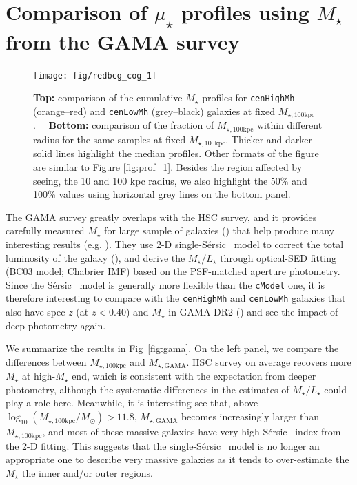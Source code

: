 \documentclass[a4paper,fleqn,usenatbib]{mnras}
\def\ser{{S\'{e}rsic\ }}
\def\rbcg{\texttt{cenHighMh}}
\def\nbcg{\texttt{cenLowMh}}
\def\mstar{{$M_{\star}$}}
\def\mtot{{$M_{\star,100\mathrm{kpc}}$}}
\def\mgama{{$M_{\star,\mathrm{GAMA}}$}}
\def\logmtot{{$\log_{10} (M_{\star,100\mathrm{kpc}}/M_{\odot})$}}
\def\m2l{{$M_{\star}/L_{\star}$}}
\def\mden{{$\mu_{\star}$}}
\begin{document}
\section{Comparison of \mden{} profiles using \mstar{} from the GAMA survey}
    \label{app:gama} 

\begin{figure}
    \centering
    \texttt{[image: fig/redbcg\_cog\_1]}
    \caption{
        \textbf{Top:} comparison of the cumulative \mstar{} profiles for 
        \rbcg{} (orange--red) and \nbcg{} (grey--black) galaxies at fixed \mtot{}.~~
        \textbf{Bottom:} comparison of the fraction of \mtot{} within different radius 
        for the same samples at fixed \mtot{}. 
        Thicker and darker solid lines highlight the median profiles. 
        Other formats of the figure are similar to Figure \ref{fig:prof_1}. 
        Besides the region affected by seeing, the 10 and 100 kpc radius, we 
        also highlight the 50\% and 100\% values using horizontal grey lines on the 
        bottom panel. 
        }
    \label{fig:cog}
\end{figure}
    
    The GAMA survey greatly overlaps with the HSC survey, and it provides carefully 
    measured \mstar{} for large sample of galaxies (\citealt{Taylor2011}) that help 
    produce many interesting results (e.g. \citealt{Bauer2013, Ferreras2017}).
    They use 2-D single-\ser{} model to correct the total luminosity of the galaxy 
    (\citealt{Kelvin2012}), and derive the \m2l{} through optical-SED fitting 
    (BC03 model; Chabrier IMF) based on the PSF-matched aperture photometry. 
    Since the \ser{} model is generally more flexible than the \texttt{cModel} one, 
    it is therefore interesting to compare with the \rbcg{} and \nbcg{} galaxies 
    that also have spec-$z$ (at $z < 0.40$) and \mstar{} in GAMA DR2 
    (\citealt{Liske2015}) and see the impact of deep photometry again. 
    
    We summarize the results in Fig~\ref{fig:gama}.  
    On the left panel, we compare the differences between \mtot{} and \mgama{}. 
    HSC survey on average recovers more \mstar{} at high-\mstar{} end, which is 
    consistent with the expectation from deeper photometry, although the 
    systematic differences in the estimates of \m2l{} could play a role here. 
    Meanwhile, it is interesting see that, above \logmtot{}$> 11.8$, \mgama{} 
    becomes increasingly larger than \mtot{}, and most of these massive 
    galaxies have very high \ser{} index from the 2-D fitting. 
    This suggests that the single-\ser{} model is no longer an appropriate one to 
    describe very massive galaxies as it tends to over-estimate the \mstar{} the 
    inner and/or outer regions. 
    
\end{document}
